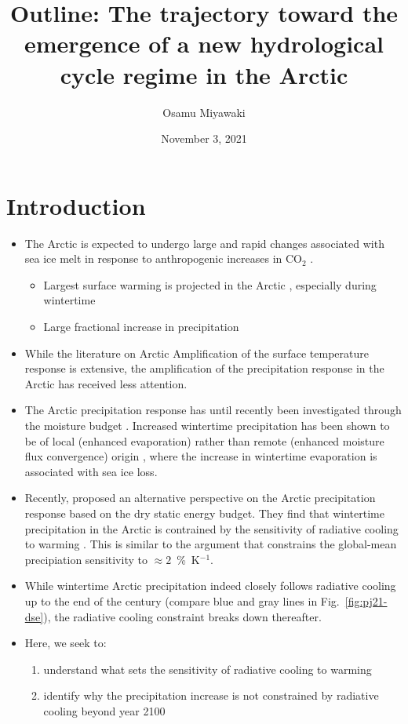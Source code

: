 \documentclass{article}
\title{Outline: The trajectory toward the emergence of a new hydrological cycle regime in the Arctic}
\date{November 3, 2021}
\author{Osamu Miyawaki}
\begin{document}
\maketitle

\section*{Introduction}
\begin{itemize}
    \item The Arctic is expected to undergo large and rapid changes associated with sea ice melt in response to anthropogenic increases in CO$_2$ \citep{dai2019, feldl2020}.
    \begin{itemize}
        \item Largest surface warming is projected in the Arctic \citep[Arctic Amplification, e.g.][]{manabe1975, held1993a}, especially during wintertime \citep{lu2009}
        \item Large fractional increase in precipitation \citep{bintanja2014,siler2018,pithan2021}
    \end{itemize}

\item While the literature on Arctic Amplification of the surface temperature response is extensive, the amplification of the precipitation response in the Arctic has received less attention. 
\item The Arctic precipitation response has until recently been investigated through the moisture budget \citep{bintanja2014,siler2018}. Increased wintertime precipitation has been shown to be of local (enhanced evaporation) rather than remote (enhanced moisture flux convergence) origin \citep[see Fig.~2b in][]{bintanja2014}, where the increase in wintertime evaporation is associated with sea ice loss.
\item Recently, \cite{pithan2021} proposed an alternative perspective on the Arctic precipitation response based on the dry static energy budget. They find that wintertime precipitation in the Arctic is contrained by the sensitivity of radiative cooling to warming \cite[see Fig.~2b in][]{pithan2021}. This is similar to the argument that constrains the global-mean precipiation sensitivity to $\approx2$~\%~K$^{-1}$.
\item While wintertime Arctic precipitation indeed closely follows radiative cooling up to the end of the century (compare blue and gray lines in Fig.~\ref{fig:pj21-dse}), the radiative cooling constraint breaks down thereafter.
\item Here, we seek to:
    \begin{enumerate}
        \item understand what sets the sensitivity of radiative cooling to warming
        \item identify why the precipitation increase is not constrained by radiative cooling beyond year 2100 
    \end{enumerate}

\end{itemize}
\end{document}
